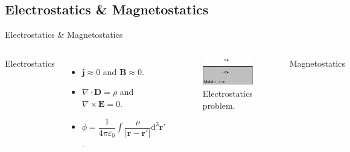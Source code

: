 \subsection{Electrostatics \& Magnetostatics}

\begin{frame}{Electrostatics \& Magnetostatics}
    \begin{columns}
        \vspace{-7mm}
        \begin{center}
            \textcolor{BlueDefault}{Electrostatics}
        \end{center}
        
        \begin{itemize}
            \item \( \mathbf{j} \approx 0\) and \( \mathbf{B} \approx 0\).
            \item \( \nabla \cdot \mathbf{D} = \rho \) and \( \nabla \times \mathbf{E} = 0 \).
            \item \( \phi = \dfrac{1}{4\pi\varepsilon_0} \int \dfrac{\rho}{|\mathbf{r}-\mathbf{r}'|} \mathrm{d}^3\mathbf{r}' \).
        \end{itemize}

        \vspace{2mm}
        \begin{figure}[!htb]
        \centering
        \includegraphics[width=\textwidth]{Figures/Image_method.pdf}
        \caption{Electrostatics problem.}
        \label{Image_method}
        \end{figure}

        \vspace{-7mm}

        \begin{center}
            \textcolor{BlueDefault}{Magnetostatics}
        \end{center}
        

\end{columns}
\end{frame}
